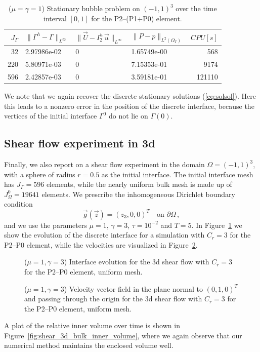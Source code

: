 \documentclass[a4paper,12pt,onecolumn]{article}
\newcommand{\errorXx}{\|\Gamma^h - \Gamma\|_{L^\infty}}
\newcommand{\errorUu}[1]{\|\vec U - I^h_{#1}\,\vec u\|_{L^\infty}}
\newcommand{\LerrorPp}{\|P - p\|_{L^2(\Omega_T)}}
\begin{document}
\begin{table}
\center
\begin{tabular}{rlllr}
\hline
$J_\Gamma$ & $\errorXx$ & $\errorUu2$ & $\LerrorPp$ & $CPU[s]$ \\
\hline
 32 & 2.97986e-02 & 0 & 1.65749e-00 &   568 \\
220 & 5.80971e-03 & 0 & 7.15353e-01 &  9174 \\
596 & 2.42857e-03 & 0 & 3.59181e-01 & 121110 \\
\hline
\end{tabular}
\caption{($\mu=\gamma=1$) Stationary bubble problem on $(-1,1)^3$ over the time
interval $[0,1]$ for the P2--(P1+P0) element.}
\label{tab:bubble3Dp2p1p0}
\end{table}

We note that we again recover the discrete stationary solutions
(\ref{eq:solsol}). Here this leads to a nonzero error in the position of the
discrete interface, because the vertices of the initial interface $\Gamma^0$ do
not lie on $\Gamma(0)$.

\subsection{Shear flow experiment in 3d}
Finally, we also report on a shear flow experiment in the domain
$\Omega=(-1,1)^3$, with a sphere of radius $r=0.5$ as the initial interface.
The initial interface mesh has $J_\Gamma = 596$ elements, while the nearly
uniform bulk mesh is made up of $J_\Omega^0 = 19641$ elements. We prescribe the
inhomogeneous Dirichlet boundary condition
\begin{equation*}
\vec g(\vec z)=(z_3,0,0)^T\quad \mbox{on }\partial\Omega\,,
\end{equation*}
and we use the parameters $\mu=1$, $\gamma=3$, $\tau=10^{-2}$ and $T=5$.
In Figure~\ref{fig:shear_3d} we show the evolution of the discrete interface
for a simulation with $C_r=3$ for the P2--P0 element, while the velocities
are visualized in Figure~\ref{fig:shear_3d_velocity}.
\begin{figure}[htbp]
\centering
{}
\caption{($\mu=1,\gamma=3$) Interface evolution for the 3d shear flow with
$C_r=3$ for the P2--P0 element, uniform mesh.}
\label{fig:shear_3d}
\end{figure}

\begin{figure}[htbp]
\centering
{}
\caption{($\mu=1,\gamma=3$) Velocity vector field in the plane normal to
$(0,1,0)^T$ and passing through the origin for the 3d shear flow with $C_r=3$
for the P2--P0 element, uniform mesh.}
\label{fig:shear_3d_velocity}
\end{figure}
A plot of the relative inner volume over time is shown in
Figure~\ref{fig:shear_3d_bulk_inner_volume}, where we again observe that our
numerical method maintains the enclosed volume well.
\end{document}
